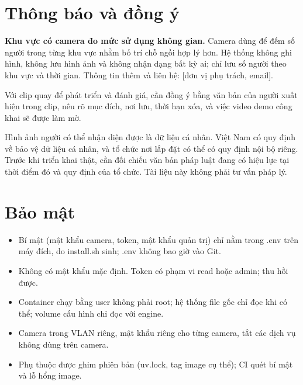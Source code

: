 \documentclass[10pt,a4paper,oneside,openany]{report}
\newcommand{\breakus}{\textunderscore\allowbreak}
\newcommand{\file}[1]{{\ttfamily\let\_\breakus #1}}
\newcommand{\code}[1]{{\ttfamily\let\_\breakus #1}}
\begin{document}
\section{Thông báo và đồng ý}
\begin{tcolorbox}[enhanced, boxrule=0.6pt, arc=2pt, colback=white, colframe=accentmid, left=10pt, right=10pt, top=7pt, bottom=7pt,
  fonttitle=\sffamily\bfseries\small, coltitle=white, colbacktitle=accent, title={Mẫu biển thông báo}]
\small\textbf{Khu vực có camera đo mức sử dụng không gian.}
Camera dùng để đếm số người trong từng khu vực nhằm bố trí chỗ ngồi hợp lý hơn. Hệ thống không ghi hình, không lưu hình ảnh và không nhận dạng
bất kỳ ai; chỉ lưu số người theo khu vực và thời gian. Thông tin thêm và liên hệ: [đơn vị phụ trách, email].
\end{tcolorbox}

Với clip quay để phát triển và đánh giá, cần đồng ý bằng văn bản của người xuất hiện trong clip, nêu rõ mục đích, nơi lưu, thời hạn xóa,
và việc video demo công khai sẽ được làm mờ.

\begin{canhbao}[Pháp lý]
Hình ảnh người có thể nhận diện được là dữ liệu cá nhân. Việt Nam có quy định về bảo vệ dữ liệu cá nhân, và tổ chức nơi lắp đặt có thể có quy định nội bộ
riêng. Trước khi triển khai thật, cần đối chiếu văn bản pháp luật đang có hiệu lực tại thời điểm đó và quy định của tổ chức. Tài liệu này không phải tư vấn pháp lý.
\end{canhbao}

\section{Bảo mật}
\begin{itemize}
  \item Bí mật (mật khẩu camera, token, mật khẩu quản trị) chỉ nằm trong \file{.env} trên máy đích, do \file{install.sh} sinh; \file{.env} không bao giờ vào Git.
  \item Không có mật khẩu mặc định. Token có phạm vi \code{read} hoặc \code{admin}; thu hồi được.
  \item Container chạy bằng user không phải root; hệ thống file gốc chỉ đọc khi có thể; volume cấu hình chỉ đọc với engine.
  \item Camera trong VLAN riêng, mật khẩu riêng cho từng camera, tắt các dịch vụ không dùng trên camera.
  \item Phụ thuộc được ghim phiên bản (\file{uv.lock}, tag image cụ thể); CI quét bí mật và lỗ hổng image.
\end{itemize}
\end{document}

